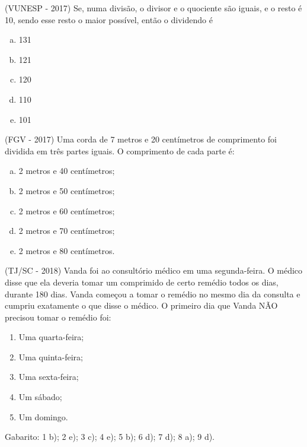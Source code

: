  \begin{exer}
 (VUNESP - 2017) Se, numa divisão, o divisor e o quociente são iguais, e o resto é 10, sendo esse resto o maior possível, então o dividendo é
  \begin{enumerate}[a)]
  \item 131
  \item 121
  \item 120
  \item 110
  \item 101
  \end{enumerate}
 \end{exer}

 \begin{exer}
 (FGV - 2017) Uma corda de 7 metros e 20 centímetros de comprimento foi dividida em três partes iguais. O comprimento de cada parte é:

  \begin{enumerate}[a)]
  \item 2 metros e 40 centímetros;
  \item 2 metros e 50 centímetros;
  \item 2 metros e 60 centímetros;
  \item 2 metros e 70 centímetros;
  \item 2 metros e 80 centímetros.
  \end{enumerate}
 \end{exer}

 \begin{exer}
 (TJ/SC - 2018) Vanda foi ao consultório médico em uma segunda-feira. O médico disse que ela deveria tomar um comprimido de certo remédio todos os dias, durante 180 dias. Vanda começou a tomar o remédio no mesmo dia da consulta e cumpriu exatamente o que disse o médico.
  O primeiro dia que Vanda NÃO precisou tomar o remédio foi:
  \begin{enumerate}
  \item Uma quarta-feira;
  \item Uma quinta-feira;
  \item Uma sexta-feira;
  \item Um sábado;
  \item Um domingo.
 \end{enumerate}
 \end{exer}

  Gabarito: 1 b); 2 e); 3 c); 4 e); 5 b); 6 d); 7 d); 8 a); 9 d).
